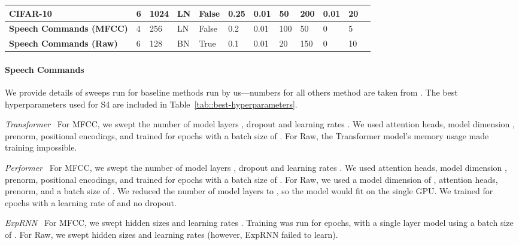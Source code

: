 \documentclass{article}
\newcommand{\methodabbrv}{S4}
\begin{document}
\begin{table*}[!t]
{\begin{tabular}{@{}llllllllllll@{}}
      \midrule
      \textbf{CIFAR-10}               & 6              & 1024                      & LN            & False             & 0.25          & 0.01     & 50               & 200          & 0.01        & 20                \\
      \midrule
      \textbf{Speech Commands (MFCC)} & 4              & 256                       & LN            & False             & 0.2           & 0.01     & 100              & 50           & 0           & 5                 \\
      \textbf{Speech Commands (Raw)}  & 6              & 128                       & BN            & True              & 0.1           & 0.01     & 20               & 150          & 0           & 10                \\
      \bottomrule
    \end{tabular}}
\end{table*}


\paragraph{Speech Commands}
We provide details of sweeps run for baseline methods run by us---numbers for all others method are taken from \citet{gu2021lssl}. The best hyperparameters used for \methodabbrv{} are included in Table~\ref{tab::best-hyperparameters}.

\textit{Transformer~\citep{vaswani2017attention}} For MFCC, we swept the number of model layers , dropout  and learning rates . We used  attention heads, model dimension , prenorm, positional encodings, and trained for  epochs with a batch size of . For Raw, the Transformer model's memory usage made training impossible.

\textit{Performer~\citep{choromanski2020rethinking}} For MFCC, we swept the number of model layers , dropout  and learning rates . We used  attention heads, model dimension , prenorm, positional encodings, and trained for  epochs with a batch size of . For Raw, we used a model dimension of ,  attention heads, prenorm, and a batch size of . We reduced the number of model layers to , so the model would fit on the single GPU. We trained for  epochs with a learning rate of  and no dropout.

\textit{ExpRNN~\citep{lezcano2019cheap}} For MFCC, we swept hidden sizes  and learning rates . Training was run for  epochs, with a single layer model using a batch size of . For Raw, we swept hidden sizes  and learning rates  (however, ExpRNN failed to learn).
\end{document}
